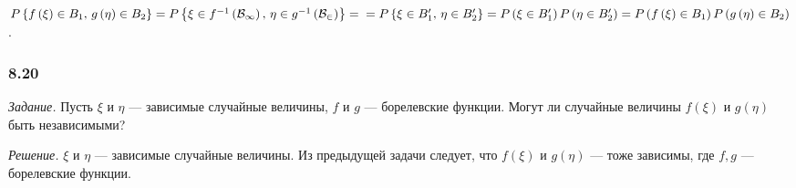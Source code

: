 $P \left\{ f \left( \xi \right) \in B_1, \, g \left( \eta \right) \in B_2 \right\} =
P \left\{ \xi \in f^{-1} \left( \mathcal{B_1} \right), \, \eta \in g^{-1} \left( \mathcal{B_2} \right) \right\} = \\
= P \left\{ \xi \in B_1', \, \eta \in B_2' \right\} =
P \left( \xi \in B_1' \right) P \left( \eta \in B_2' \right) =
P \left( f \left( \xi \right) \in B_1 \right) P \left( g \left( \eta \right) \in B_2 \right) $.

\subsubsection*{8.20}

\textit{Задание.} Пусть $ \xi $ и $ \eta $ --- зависимые случайные величины, $f$ и $g$ --- борелевские функции.
Могут ли случайные величины $f \left( \xi \right) $ и $g \left( \eta \right) $ быть независимыми?

\textit{Решение.} $ \xi $ и $ \eta $ --- зависимые случайные величины.
Из предыдущей задачи следует, что $f \left( \xi \right) $ и $g \left( \eta \right) $ --- тоже зависимы, где $f, g$ --- борелевские функции.
